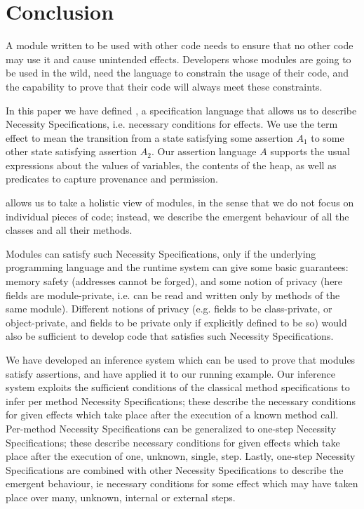 \section{Conclusion}
\label{s:conclusion}

A module written to be  used with other code needs to ensure that no other code 
may use it and cause unintended effects. Developers whose modules are going to be used in the wild, need the language to constrain the usage of their code, and the capability to prove that their code will always meet these constraints. 

In this paper we have defined \Chainmail, a specification language that allows us to
describe Necessity Specifications, i.e. necessary  conditions for effects.
We use the term  effect to mean the transition from a  state satisfying some assertion 
$A_1$ to some  other state satisfying  assertion $A_2$. 
Our assertion language $A$ supports the usual expressions about the values of
variables, the contents of the heap, as well as predicates to capture provenance 
and permission.

\Chainmail allows us to take a holistic view of modules, in the sense that we do not focus
on individual pieces of code; instead, we  describe  the emergent behaviour of all
the classes and all their methods. 

Modules can satisfy such Necessity Specifications, only if
the underlying programming language and the runtime system 
can give some basic guarantees:
 memory safety (addresses cannot be forged), 
and some notion of privacy (here fields are module-private, i.e. can be read and written only
by methods of the same module). Different notions of privacy 
(e.g. fields to be class-private,
or object-private, and fields to be private only if explicitly defined to be so)  would
also be sufficient to develop code that satisfies such Necessity Specifications.

We have developed an inference system which can be used to prove that modules satisfy  
\Chainmail assertions, and have applied it to our running example. 
Our inference system exploits the sufficient conditions of the classical
method specifications to infer per method Necessity Specifications;  
these describe the necessary conditions for given effects
which take place after the execution of a known method call. 
Per-method Necessity Specifications can be generalized to one-step
 Necessity Specifications; these describe necessary conditions for
 given effects  which take place after the execution of one, 
 unknown, single, step. 
 Lastly, one-step
Necessity Specifications are combined with other Necessity Specifications
 to describe the emergent behaviour, ie  necessary conditions for some effect which
 may have taken place over many, unknown, internal or external steps.
 
